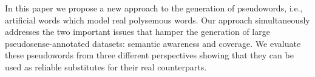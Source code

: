 In this paper we propose a new approach to the generation of pseudowords, i.e., artificial words which model real polysemous words. Our approach simultaneously
 addresses the two important issues that hamper the generation of large
 pseudosense-annotated datasets: semantic awareness and coverage. We evaluate
 these pseudowords from three different perspectives showing that they can be
 used as reliable substitutes for their real counterparts.

